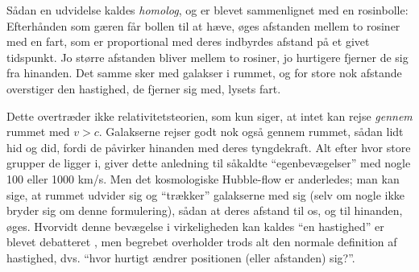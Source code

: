 \documentclass[useAMS,danish]{aa}
\begin{document}
Sådan en udvidelse kaldes \emph{homolog}, og er blevet sammenlignet med en rosinbolle:
Efterhånden som gæren får bollen til at hæve, øges afstanden mellem to rosiner med en fart, som er proportional med deres indbyrdes afstand på et givet tidspunkt.
Jo større afstanden bliver mellem to rosiner, jo hurtigere fjerner de sig fra hinanden.
Det samme sker med galakser i rummet, og for store nok afstande overstiger den hastighed, de fjerner sig med, lysets fart.

Dette overtræder ikke relativitetsteorien, som kun siger, at intet kan rejse \emph{gennem} rummet med $v>c$.
Galakserne rejser godt nok også gennem rummet, sådan lidt hid og did, fordi de påvirker hinanden med deres tyngdekraft.
Alt efter hvor store grupper de ligger i, giver dette anledning til såkaldte ``egenbevægelser'' med nogle 100 eller 1000 km/s.
Men det kosmologiske Hubble-flow er anderledes; man kan sige, at rummet udvider sig og ``trækker'' galakserne med sig (selv om nogle ikke bryder sig om denne formulering), sådan at deres afstand til os, og til hinanden, øges.
Hvorvidt denne bevægelse i virkeligheden kan kaldes ``en hastighed'' er blevet debatteret \citep[f.eks.][]{Harrison2000}, men begrebet overholder trods alt den normale definition af hastighed, dvs. ``hvor hurtigt ændrer positionen (eller afstanden) sig?''.
\end{document}
